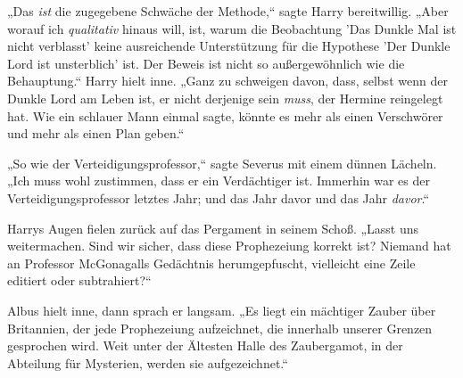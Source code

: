 „Das \emph{ist} die zugegebene Schwäche der Methode,“ sagte Harry bereitwillig. „Aber worauf ich \emph{qualitativ} hinaus will, ist, warum die Beobachtung 'Das Dunkle Mal ist nicht verblasst' keine ausreichende Unterstützung für die Hypothese 'Der Dunkle Lord ist unsterblich' ist. Der Beweis ist nicht so außergewöhnlich wie die Behauptung.“ Harry hielt inne. „Ganz zu schweigen davon, dass, selbst wenn der Dunkle Lord am Leben ist, er nicht derjenige sein \emph{muss}, der Hermine reingelegt hat. Wie ein schlauer Mann einmal sagte, könnte es mehr als einen Verschwörer und mehr als einen Plan geben.“

„So wie der Verteidigungsprofessor,“ sagte Severus mit einem dünnen Lächeln. „Ich muss wohl zustimmen, dass er ein Verdächtiger ist. Immerhin war es der Verteidigungsprofessor letztes Jahr; und das Jahr davor und das Jahr \emph{davor}.“

Harrys Augen fielen zurück auf das Pergament in seinem Schoß. „Lasst uns weitermachen. Sind wir sicher, dass diese Prophezeiung korrekt ist? Niemand hat an Professor McGonagalls Gedächtnis herumgepfuscht, vielleicht eine Zeile editiert oder subtrahiert?“

Albus hielt inne, dann sprach er langsam. „Es liegt ein mächtiger Zauber über Britannien, der jede Prophezeiung aufzeichnet, die innerhalb unserer Grenzen gesprochen wird. Weit unter der Ältesten Halle des Zaubergamot, in der Abteilung für Mysterien, werden sie aufgezeichnet.“

